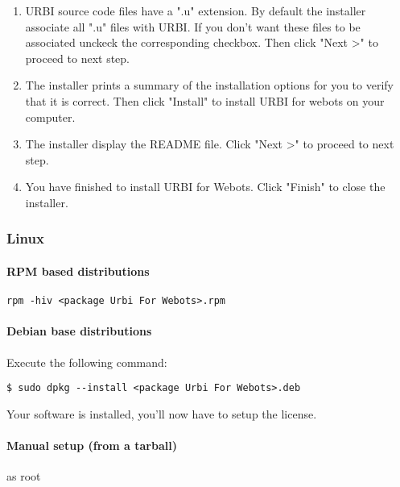 \begin{enumerate}
\item URBI source code files have a ".u" extension. By default the
  installer associate all ".u" files with URBI. If you don't want
  these files to be associated unckeck the corresponding
  checkbox. Then click "Next >{}" to proceed to next step.

\item The installer prints a summary of the installation options for
  you to verify that it is correct. Then click "Install" to install
  URBI for webots on your computer.

\item The installer display the README file. Click "Next >{}" to
  proceed to next step.

\item You have finished to install URBI for Webots. Click "Finish" to
  close the installer.
\end{enumerate}

\subsubsection{Linux}
\label{webots.setup.linux}%

\paragraph{RPM based distributions}
\label{webots.setup.linux.rpm}%

\begin{lstlisting}
rpm -hiv <package Urbi For Webots>.rpm
\end{lstlisting}

\paragraph{Debian base distributions}
\label{webots.setup.linux.deb}%

Execute the following command:


\begin{lstlisting}
$ sudo dpkg --install <package Urbi For Webots>.deb
\end{lstlisting}

Your software is installed, you'll now have to setup the license.


\paragraph{Manual setup (from a tarball)}
\label{webots.setup.linux.tarball}%
     as root


